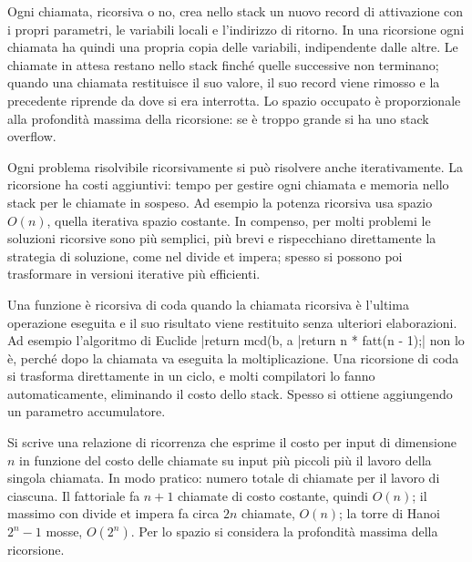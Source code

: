 \begin{orale}
Ogni chiamata, ricorsiva o no, crea nello stack un nuovo record di attivazione con
i propri parametri, le variabili locali e l'indirizzo di ritorno. In una ricorsione
ogni chiamata ha quindi una propria copia delle variabili, indipendente dalle altre.
Le chiamate in attesa restano nello stack finché quelle successive non terminano;
quando una chiamata restituisce il suo valore, il suo record viene rimosso e la
precedente riprende da dove si era interrotta. Lo spazio occupato è proporzionale
alla profondità massima della ricorsione: se è troppo grande si ha uno stack overflow.
\end{orale}

\begin{orale}
Ogni problema risolvibile ricorsivamente si può risolvere anche iterativamente.
La ricorsione ha costi aggiuntivi: tempo per gestire ogni chiamata e memoria nello
stack per le chiamate in sospeso. Ad esempio la potenza ricorsiva usa spazio $O(n)$,
quella iterativa spazio costante. In compenso, per molti problemi le soluzioni
ricorsive sono più semplici, più brevi e rispecchiano direttamente la strategia di
soluzione, come nel divide et impera; spesso si possono poi trasformare in versioni
iterative più efficienti.
\end{orale}

\begin{orale}
Una funzione è ricorsiva di coda quando la chiamata ricorsiva è l'ultima operazione
eseguita e il suo risultato viene restituito senza ulteriori elaborazioni. Ad esempio
l'algoritmo di Euclide \cc|return mcd(b, a %
\cc|return n * fatt(n - 1);| non lo è, perché dopo la chiamata va eseguita la
moltiplicazione. Una ricorsione di coda si trasforma direttamente in un ciclo, e
molti compilatori lo fanno automaticamente, eliminando il costo dello stack.
Spesso si ottiene aggiungendo un parametro accumulatore.
\end{orale}

\begin{orale}
Si scrive una relazione di ricorrenza che esprime il costo per input di dimensione
$n$ in funzione del costo delle chiamate su input più piccoli più il lavoro della
singola chiamata. In modo pratico: numero totale di chiamate per il lavoro di
ciascuna. Il fattoriale fa $n + 1$ chiamate di costo costante, quindi $O(n)$; il
massimo con divide et impera fa circa $2n$ chiamate, $O(n)$; la torre di Hanoi
$2^n - 1$ mosse, $O(2^n)$. Per lo spazio si considera la profondità massima della
ricorsione.
\end{orale}

